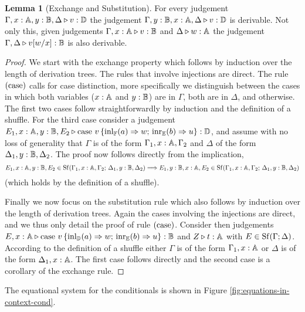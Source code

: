 \documentclass[10pt,a4paper]{amsart}
\theoremstyle{definition}
\theoremstyle{definition}
\theoremstyle{definition}
\newtheorem{lemma}[definition]{Lemma}
\theoremstyle{definition}
\theoremstyle{definition}
\theoremstyle{definition}
\begin{document}
\begin{lemma}[Exchange and Substitution]
\label{lem:exh_and_sub} 
For every judgement $\Gamma,x: \mathbb{A}, y: \mathbb{B}, \Delta \triangleright v: \mathbb{D}$ the
judgement $\Gamma, y:\mathbb{B}, x:\mathbb{A}, \Delta \triangleright v:
\mathbb{D}$ is derivable. Not only this, given judgements  $\Gamma,x:\mathbb{A} \triangleright
v: \mathbb{B}$ and $\Delta \triangleright w: \mathbb{A}$ the judgement $\Gamma, \Delta \triangleright
v[w/x]: \mathbb{B}$ is also derivable.
\end{lemma}


\begin{proof}
We start with the exchange property which follows by induction over the length
of derivation trees. The rules that involve injections are direct.  The rule
$(\mathrm{case})$ calls for case distinction, more specifically we  distinguish
between the cases in which both variables ($x : \mathbb{A}$ and $y : \mathbb{B}$) are
in $\Gamma$, both are in $\Delta$, and otherwise. The first two cases follow
straightforwardly by induction and the definition of a shuffle. For the third
case consider a judgement $E_1,x : \mathbb{A}, y : \mathbb{B}, E_2 \triangleright \text{case }
v\, \{\mathrm{inl}_{\mathbb{F}}(a) \Rightarrow w ; \, \mathrm{inr}_{\mathbb{E}}(b) \Rightarrow u \}:
\mathbb{D}$, and assume with no loss of generality that $\Gamma$ is of the form
$\Gamma_1, x : \mathbb{A}, \Gamma_2$ and $\Delta$ of the form $\Delta_1, y :
\mathbb{B}, \Delta_2$. The proof now follows directly from the implication,
\[
        E_1, x : \mathbb{A}, y : \mathbb{B}, E_2 \in \mathrm{Sf}(\Gamma_1, x : \mathbb{A}, \Gamma_2 ; \,
        \Delta_1, y : \mathbb{B}, \Delta_2)
        \Longrightarrow
        E_1, y : \mathbb{B}, x : \mathbb{A}, E_2 \in \mathrm{Sf}(\Gamma_1, x : \mathbb{A}, \Gamma_2 ; \,
        \Delta_1, y : \mathbb{B}, \Delta_2)
\]
(which holds by the definition of a shuffle).

Finally we now focus on the substitution rule which also follows by induction over the
length of derivation trees. Again the cases involving the injections are direct,
and we thus only detail the proof of rule $(\mathrm{case})$. Consider then
judgements $E,x : \mathbb{A} \triangleright \text{case } v\, \{\mathrm{inl}_{\mathbb{D}}(a) \Rightarrow
w ; \, \mathrm{inr}_{\mathbb{E}}(b) \Rightarrow u \}: \mathbb{B}$ and
$Z \triangleright t : \mathbb{A}$ with $E \in \mathrm{Sf}(\Gamma; \Delta)$. According to the definition
of a shuffle either $\Gamma$ is of the form $\Gamma_1, x: \mathbb{A}$ or $\Delta$ is
of the form $\Delta_1, x : \mathbb{A}$. The first case follows directly and the second case
is a corollary of the exchange rule.
\end{proof}

The equational system for the conditionals is shown in Figure
\ref{fig:equations-in-context-cond}.
\end{document}
